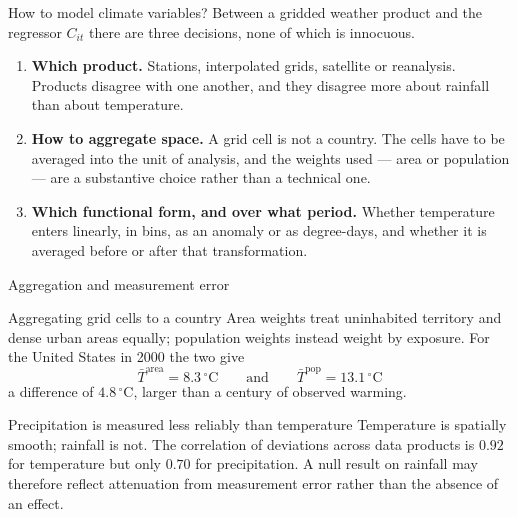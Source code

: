 \documentclass[aspectratio=169,10pt]{beamer}
\begin{document}
\begin{frame}{How to model climate variables?}
  Between a gridded weather product and the regressor $C_{it}$ there are three
  decisions, none of which is innocuous.
  \vspace{4pt}
  \begin{enumerate}
    \item \textbf{Which product.} Stations, interpolated grids, satellite or
          reanalysis. Products disagree with one another, and they disagree more
          about rainfall than about temperature.
    \item \textbf{How to aggregate space.} A grid cell is not a country. The cells
          have to be averaged into the unit of analysis, and the weights used ---
          area or population --- are a substantive choice rather than a technical
          one.
    \item \textbf{Which functional form, and over what period.} Whether temperature
          enters linearly, in bins, as an anomaly or as degree-days, and whether it
          is averaged before or after that transformation.
  \end{enumerate}
\end{frame}

\begin{frame}{Aggregation and measurement error}
  \begin{block}{Aggregating grid cells to a country}
    \small Area weights treat uninhabited territory and dense urban areas equally;
    population weights instead weight by exposure. For the United States in 2000 the
    two give
    \[
      \bar{T}^{\text{area}} = 8.3\,^\circ\mathrm{C}
      \qquad\text{and}\qquad
      \bar{T}^{\text{pop}} = 13.1\,^\circ\mathrm{C}
    \]
    a difference of $4.8\,^\circ$C, larger than a century of observed warming.
  \end{block}
  \begin{block}{Precipitation is measured less reliably than temperature}
    \small Temperature is spatially smooth; rainfall is not. The correlation of
    deviations across data products is $0.92$ for temperature but only $0.70$ for
    precipitation. A null result on rainfall may therefore reflect attenuation from
    measurement error rather than the absence of an effect.
  \end{block}
\end{frame}
\end{document}

